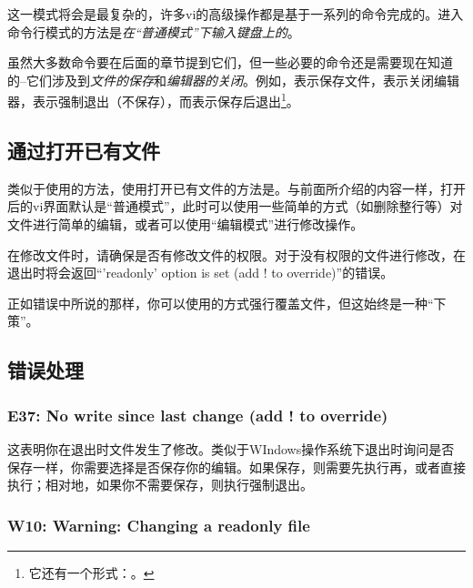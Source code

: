 这一模式将会是最复杂的，许多vi的高级操作都是基于一系列的命令完成的。进入命令行模式的方法是\emph{在“普通模式”下输入键盘上的\code{:}}。

虽然大多数命令要在后面的章节提到它们，但一些必要的命令还是需要现在知道的--它们涉及到\emph{文件的保存}和\emph{编辑器的关闭}。例如，表示保存文件，表示关闭编辑器，表示强制退出（不保存），而表示保存后退出\footnote{它还有一个形式：。}。

\subsection{通过打开已有文件}\label{subsec:使用vi,vim创建文件-通过vi打开已有文件}

类似于使用的方法，使用打开已有文件的方法是。与前面所介绍的内容一样，打开后的vi界面默认是“普通模式”，此时可以使用一些简单的方式（如删除整行等）对文件进行简单的编辑，或者可以使用“编辑模式”进行修改操作。

\begin{attention}
    在修改文件时，请确保是否有修改文件的权限。对于没有权限的文件进行修改，在退出时将会返回“'readonly' option is set (add ! to override)”的错误。

    正如错误中所说的那样，你可以使用的方式强行覆盖文件，但这始终是一种“下策”。
\end{attention}


\subsection{错误处理}\label{subsec:节标题-错误处理}

\subsubsection{E37: No write since last change (add ! to override) }

这表明你在退出时文件发生了修改。类似于WIndows操作系统下退出时询问是否保存一样，你需要选择是否保存你的编辑。如果保存，则需要先执行再，或者直接执行；相对地，如果你不需要保存，则执行强制退出。

\subsubsection{W10: Warning: Changing a readonly file}

